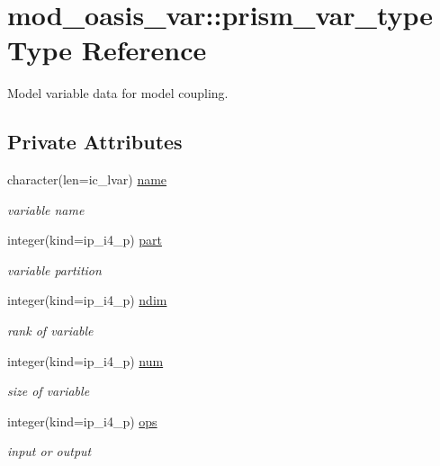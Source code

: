 \hypertarget{structmod__oasis__var_1_1prism__var__type}{\section{mod\+\_\+oasis\+\_\+var\+:\+:prism\+\_\+var\+\_\+type Type Reference}
\label{structmod__oasis__var_1_1prism__var__type}
}


Model variable data for model coupling.  


\subsection*{Private Attributes}
\begin{DoxyCompactItemize}
\item 
character(len=ic\+\_\+lvar) \hyperlink{structmod__oasis__var_1_1prism__var__type_a90fb2c4252337f674bd4e3dc29c02f6b}{name}
\begin{DoxyCompactList}\small\item\em variable name \end{DoxyCompactList}\item 
integer(kind=ip\+\_\+i4\+\_\+p) \hyperlink{structmod__oasis__var_1_1prism__var__type_a370ca8fd795e1d832bdcce52705e8f0c}{part}
\begin{DoxyCompactList}\small\item\em variable partition \end{DoxyCompactList}\item 
integer(kind=ip\+\_\+i4\+\_\+p) \hyperlink{structmod__oasis__var_1_1prism__var__type_a21345a842b0dfd5dcf4a00c2356035da}{ndim}
\begin{DoxyCompactList}\small\item\em rank of variable \end{DoxyCompactList}\item 
integer(kind=ip\+\_\+i4\+\_\+p) \hyperlink{structmod__oasis__var_1_1prism__var__type_a717aa9d5848cee514dcaf036936c8f1b}{num}
\begin{DoxyCompactList}\small\item\em size of variable \end{DoxyCompactList}\item 
integer(kind=ip\+\_\+i4\+\_\+p) \hyperlink{structmod__oasis__var_1_1prism__var__type_a9235132dc1d3cf0b89211c09dcc62fa2}{ops}
\begin{DoxyCompactList}\small\item\em input or output \end{DoxyCompactList}\item 

\end{DoxyCompactItemize}
